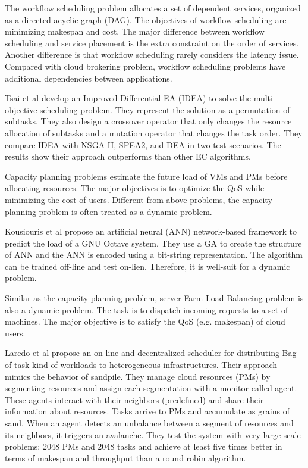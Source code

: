 \vspace{5mm}

The workflow scheduling problem allocates a set of dependent services, organized as a directed acyclic graph (DAG). The objectives of workflow scheduling are minimizing makespan and cost. The major difference between workflow scheduling and service placement is the extra constraint on the order of services. Another difference is that workflow scheduling rarely considers the latency issue. Compared with cloud brokering problem, workflow scheduling problems have additional dependencies between applications.

 Tsai et al \cite{Tsai:2013fn} develop an Improved Differential EA (IDEA) to solve the multi-objective scheduling problem. They represent the solution as a permutation of subtasks. They also design a crossover operator that only changes the resource allocation of subtasks and a mutation operator that changes the task order. They compare IDEA with NSGA-II, SPEA2, and DEA in two test scenarios. The results show their approach outperforms than other EC algorithms. 

\vspace{5mm}

Capacity planning problems estimate the future load of VMs and PMs before allocating resources.
The major objectives is to optimize the QoS while minimizing the cost of users. Different from above problems, the capacity planning problem is often treated as a dynamic problem. 

Kousiouris et al \cite{Kousiouris:2013vg} propose an artificial neural (ANN) network-based framework to predict the load of a GNU Octave system. They use a GA to create the structure of ANN and the ANN is encoded using a bit-string representation. The algorithm can be trained off-line and test on-lien. Therefore, it is well-suit for a dynamic problem.

\vspace{5mm}

Similar as the capacity planning problem, server Farm Load Balancing problem is also a dynamic problem. The task is to dispatch incoming requests to a set of machines. The major objective is to satisfy the QoS (e.g. makespan) of cloud users.

Laredo et al \cite{Laredo:2014db} propose an on-line and decentralized scheduler for distributing Bag-of-task kind of workloads to heterogeneous infrastructures. Their approach mimics the behavior of sandpile. They manage cloud resources (PMs) by segmenting resources and assign each segmentation with a monitor called agent. These agents interact with their neighbors (predefined) and share their information about resources. Tasks arrive to PMs and accumulate as grains of sand. When an agent detects an unbalance between a segment of resources and its neighbors, it triggers an avalanche. They test the system with very large scale problems: 2048 PMs and 2048 tasks and achieve at least five times better in terms of makespan and throughput than a round robin algorithm.

